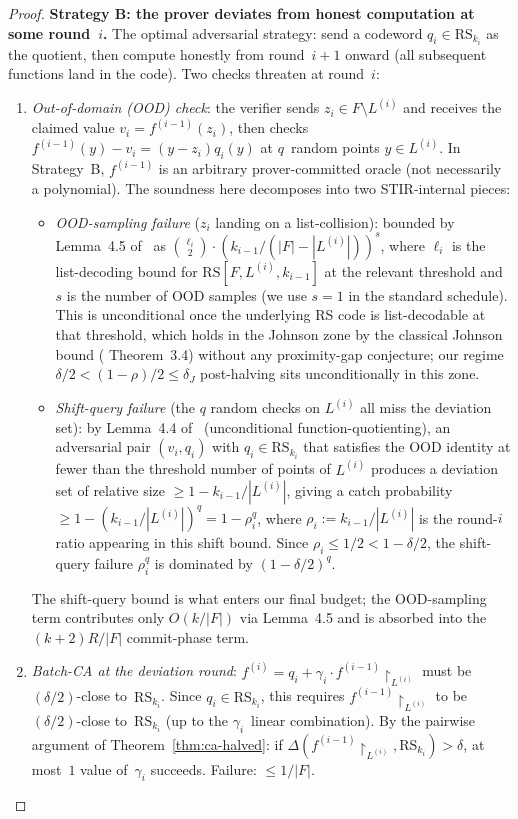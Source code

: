 \documentclass[11pt]{article}
\newcommand{\RS}{\mathrm{RS}}
\begin{document}
\begin{proof}
\textbf{Strategy B: the prover deviates from honest computation at some round~$i$.} The optimal adversarial strategy: send a codeword $q_i \in \RS_{k_i}$ as the quotient, then compute honestly from round~$i{+}1$ onward (all subsequent functions land in the code). Two checks threaten at round~$i$:

\begin{enumerate}[nosep]
\item \emph{Out-of-domain (OOD) check}: the verifier sends $z_i \in F \setminus L^{(i)}$ and receives the claimed value $v_i = f^{(i-1)}(z_i)$, then checks $f^{(i-1)}(y) - v_i = (y - z_i) q_i(y)$ at $q$~random points $y \in L^{(i)}$. In Strategy~B, $f^{(i-1)}$ is an arbitrary prover-committed oracle (not necessarily a polynomial). The soundness here decomposes into two STIR-internal pieces:
\begin{itemize}[nosep]
\item \emph{OOD-sampling failure} ($z_i$ landing on a list-collision): bounded by Lemma~4.5 of~\cite{STIR} as $\binom{\ell_i}{2} \cdot (k_{i-1}/(|F| - |L^{(i)}|))^s$, where $\ell_i$ is the list-decoding bound for $\RS[F, L^{(i)}, k_{i-1}]$ at the relevant threshold and $s$ is the number of OOD samples (we use $s = 1$ in the standard schedule). This is unconditional once the underlying RS code is list-decodable at that threshold, which holds in the Johnson zone by the classical Johnson bound (\cite{STIR} Theorem~3.4) without any proximity-gap conjecture; our regime $\delta/2 < (1{-}\rho)/2 \leq \delta_J$ post-halving sits unconditionally in this zone.
\item \emph{Shift-query failure} (the $q$ random checks on $L^{(i)}$ all miss the deviation set): by Lemma~4.4 of~\cite{STIR} (unconditional function-quotienting), an adversarial pair $(v_i, q_i)$ with $q_i \in \RS_{k_i}$ that satisfies the OOD identity at fewer than the threshold number of points of $L^{(i)}$ produces a deviation set of relative size $\geq 1 - k_{i-1}/|L^{(i)}|$, giving a catch probability $\geq 1 - (k_{i-1}/|L^{(i)}|)^q = 1 - \rho_i^q$, where $\rho_i := k_{i-1}/|L^{(i)}|$ is the round-$i$ ratio appearing in this shift bound. Since $\rho_i \leq 1/2 < 1{-}\delta/2$, the shift-query failure $\rho_i^q$ is dominated by $(1{-}\delta/2)^q$.
\end{itemize}
The shift-query bound is what enters our final budget; the OOD-sampling term contributes only $O(k/|F|)$ via Lemma~4.5 and is absorbed into the $(k+2)R/|F|$ commit-phase term.

\item \emph{Batch-CA at the deviation round}: $f^{(i)} = q_i + \gamma_i \cdot f^{(i-1)}\!\!\restriction_{L^{(i)}}$ must be $(\delta/2)$-close to~$\RS_{k_i}$. Since $q_i \in \RS_{k_i}$, this requires $f^{(i-1)}\!\!\restriction_{L^{(i)}}$ to be $(\delta/2)$-close to~$\RS_{k_i}$ (up to the $\gamma_i$~linear combination). By the pairwise argument of Theorem~\ref{thm:ca-halved}: if $\Delta(f^{(i-1)}\!\!\restriction_{L^{(i)}}, \RS_{k_i}) > \delta$, at most~$1$ value of~$\gamma_i$ succeeds. Failure: $\leq 1/|F|$.
\end{enumerate}


\end{proof}
\end{document}
